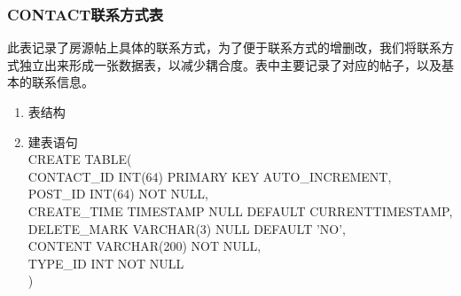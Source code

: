 \subsubsection{CONTACT联系方式表}
此表记录了房源帖上具体的联系方式，为了便于联系方式的增删改，我们将联系方式独立出来形成一张数据表，以减少耦合度。表中主要记录了对应的帖子，以及基本的联系信息。
\begin{enumerate}
    \item 表结构
    \begin{table}[htbp]
        \centering
        \end{table}
    \item 建表语句\\
        CREATE TABLE(\\
            CONTACT\_ID INT(64) PRIMARY KEY AUTO\_INCREMENT,\\
            POST\_ID INT(64) NOT NULL,\\
            CREATE\_TIME TIMESTAMP NULL DEFAULT CURRENTTIMESTAMP,\\
            DELETE\_MARK VARCHAR(3) NULL DEFAULT 'NO',\\
            CONTENT VARCHAR(200) NOT NULL,\\
            TYPE\_ID INT NOT NULL\\
        )
    \end{enumerate}

